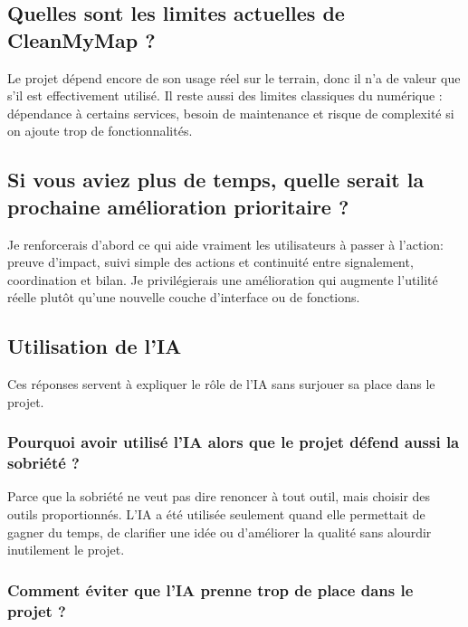 \documentclass[
  10pt,
  a4paper,
  DIV=11,
  numbers=noendperiod,
  oneside]{scrreprt}
\begin{document}
\subsection{Quelles sont les limites actuelles de CleanMyMap
?}\label{quelles-sont-les-limites-actuelles-de-cleanmymap}

Le projet dépend encore de son usage réel sur le terrain, donc il n'a de
valeur que s'il est effectivement utilisé. Il reste aussi des limites
classiques du numérique : dépendance à certains services, besoin de
maintenance et risque de complexité si on ajoute trop de
fonctionnalités.

\subsection{Si vous aviez plus de temps, quelle serait la prochaine
amélioration prioritaire
?}\label{si-vous-aviez-plus-de-temps-quelle-serait-la-prochaine-amuxe9lioration-prioritaire}

Je renforcerais d'abord ce qui aide vraiment les utilisateurs à passer à
l'action: preuve d'impact, suivi simple des actions et continuité entre
signalement, coordination et bilan. Je privilégierais une amélioration
qui augmente l'utilité réelle plutôt qu'une nouvelle couche d'interface
ou de fonctions.

\subsection{Utilisation de l'IA}\label{utilisation-de-lia}

Ces réponses servent à expliquer le rôle de l'IA sans surjouer sa place
dans le projet.

\subsubsection{Pourquoi avoir utilisé l'IA alors que le projet défend
aussi la sobriété
?}\label{pourquoi-avoir-utilisuxe9-lia-alors-que-le-projet-duxe9fend-aussi-la-sobriuxe9tuxe9-1}

Parce que la sobriété ne veut pas dire renoncer à tout outil, mais
choisir des outils proportionnés. L'IA a été utilisée seulement quand
elle permettait de gagner du temps, de clarifier une idée ou d'améliorer
la qualité sans alourdir inutilement le projet.

\subsubsection{Comment éviter que l'IA prenne trop de place dans le
projet
?}\label{comment-uxe9viter-que-lia-prenne-trop-de-place-dans-le-projet}
\end{document}
